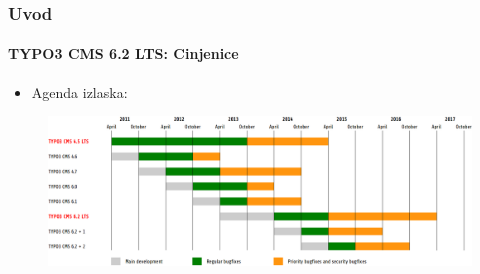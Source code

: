 
\begin{frame}[fragile]
	\frametitle{Uvod}
	\framesubtitle{TYPO3 CMS 6.2 LTS: Cinjenice}

	\begin{itemize}
		\item Agenda izlaska:
	\end{itemize}

	\begin{figure}
		\includegraphics[width=0.99\linewidth]{Images/Introduction/ReleaseAgenda.png}
	\end{figure}

\end{frame}


